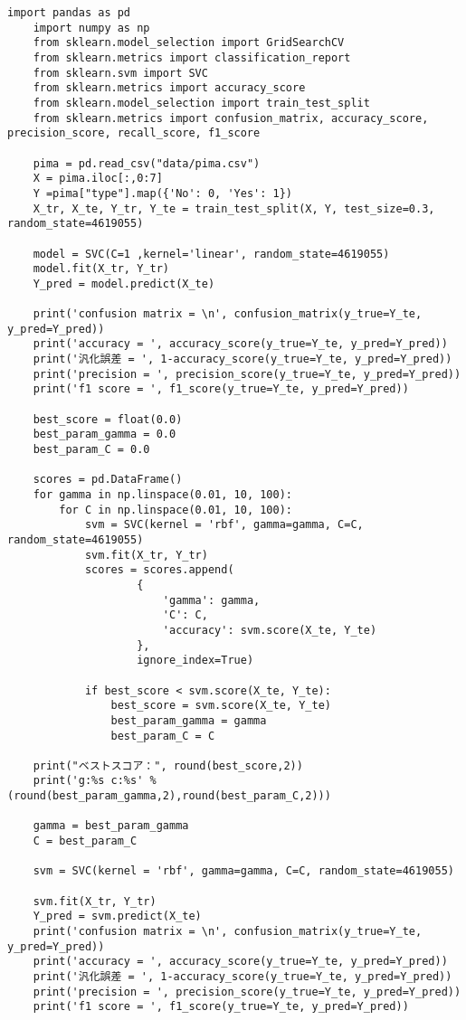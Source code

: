 \documentclass[12pt]{jarticle}
\begin{document}
\begin{lstlisting}[style = py,caption=レポート課題2]
    import pandas as pd
    import numpy as np
    from sklearn.model_selection import GridSearchCV
    from sklearn.metrics import classification_report
    from sklearn.svm import SVC
    from sklearn.metrics import accuracy_score
    from sklearn.model_selection import train_test_split
    from sklearn.metrics import confusion_matrix, accuracy_score, precision_score, recall_score, f1_score
    
    pima = pd.read_csv("data/pima.csv")
    X = pima.iloc[:,0:7]
    Y =pima["type"].map({'No': 0, 'Yes': 1})
    X_tr, X_te, Y_tr, Y_te = train_test_split(X, Y, test_size=0.3, random_state=4619055)
    
    model = SVC(C=1 ,kernel='linear', random_state=4619055)
    model.fit(X_tr, Y_tr)
    Y_pred = model.predict(X_te)    
    
    print('confusion matrix = \n', confusion_matrix(y_true=Y_te, y_pred=Y_pred))
    print('accuracy = ', accuracy_score(y_true=Y_te, y_pred=Y_pred))
    print('汎化誤差 = ', 1-accuracy_score(y_true=Y_te, y_pred=Y_pred))
    print('precision = ', precision_score(y_true=Y_te, y_pred=Y_pred))
    print('f1 score = ', f1_score(y_true=Y_te, y_pred=Y_pred))
    
    best_score = float(0.0)
    best_param_gamma = 0.0
    best_param_C = 0.0
     
    scores = pd.DataFrame()
    for gamma in np.linspace(0.01, 10, 100):
        for C in np.linspace(0.01, 10, 100):
            svm = SVC(kernel = 'rbf', gamma=gamma, C=C, random_state=4619055)
            svm.fit(X_tr, Y_tr)
            scores = scores.append(
                    {
                        'gamma': gamma,
                        'C': C,
                        'accuracy': svm.score(X_te, Y_te)
                    },
                    ignore_index=True)
            
            if best_score < svm.score(X_te, Y_te):
                best_score = svm.score(X_te, Y_te)
                best_param_gamma = gamma
                best_param_C = C
                
    print("ベストスコア：", round(best_score,2))
    print('g:%s c:%s' %(round(best_param_gamma,2),round(best_param_C,2)))
    
    gamma = best_param_gamma
    C = best_param_C
     
    svm = SVC(kernel = 'rbf', gamma=gamma, C=C, random_state=4619055)
     
    svm.fit(X_tr, Y_tr)
    Y_pred = svm.predict(X_te)
    print('confusion matrix = \n', confusion_matrix(y_true=Y_te, y_pred=Y_pred))
    print('accuracy = ', accuracy_score(y_true=Y_te, y_pred=Y_pred))
    print('汎化誤差 = ', 1-accuracy_score(y_true=Y_te, y_pred=Y_pred))
    print('precision = ', precision_score(y_true=Y_te, y_pred=Y_pred))
    print('f1 score = ', f1_score(y_true=Y_te, y_pred=Y_pred))
\end{lstlisting}
\end{document}
